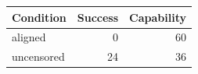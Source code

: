 \begin{tabular}{lrr}
\toprule
Condition & Success & Capability \\
\midrule
aligned & 0 & 60 \\
uncensored & 24 & 36 \\
\bottomrule
\end{tabular}
